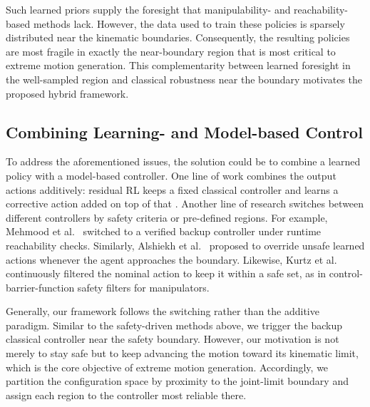 \documentclass[journal, twoside]{IEEEtran}
\begin{document}
Such learned priors supply the foresight that manipulability- and reachability-based methods lack. However, the data used to train these policies is sparsely distributed near the kinematic boundaries. Consequently, the resulting policies are most fragile in exactly the near-boundary region that is most critical to extreme motion generation. This complementarity between learned foresight in the well-sampled region and classical robustness near the boundary motivates the proposed hybrid framework.

\subsection{Combining Learning- and Model-based Control}
To address the aforementioned issues, the solution could be to combine a learned policy with a model-based controller. One line of work combines the output actions additively: residual RL keeps a fixed classical controller and learns a corrective action added on top of that \cite{johannink2019residual,silver2018residual}. Another line of research switches between different controllers by safety criteria or pre-defined regions. For example, Mehmood et al.~\cite{mehmood2022black} switched to a verified backup controller under runtime reachability checks. Similarly, Alshiekh et al.~\cite{alshiekh2018safe} proposed to override unsafe learned actions whenever the agent approaches the boundary. Likewise, Kurtz et al.~\cite{kurtz2021control} continuously filtered the nominal action to keep it within a safe set, as in control-barrier-function safety filters for manipulators.

Generally, our framework follows the switching rather than the additive paradigm. Similar to the safety-driven methods above, we trigger the backup classical controller near the safety boundary. However, our motivation is not merely to stay safe but to keep advancing the motion toward its kinematic limit, which is the core objective of extreme motion generation. Accordingly, we partition the configuration space by proximity to the joint-limit boundary and assign each region to the controller most reliable there.
\end{document}

